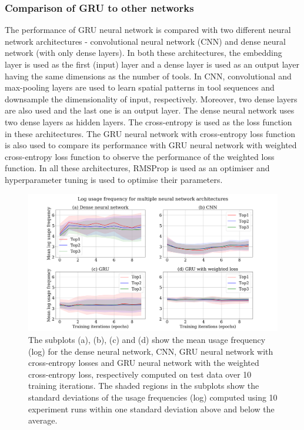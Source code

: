 \documentclass{bioinfo}
\begin{document}
\subsubsection{Comparison of GRU to other networks}
The performance of GRU neural network is compared with two different neural network architectures - convolutional neural network (CNN) and dense neural network (with only dense layers). In both these architectures, the embedding layer is used as the first (input) layer and a dense layer is used as an output layer having the same dimensions as the number of tools. In CNN, convolutional and max-pooling layers are used to learn spatial patterns in tool sequences and downsample the dimensionality of input, respectively. Moreover, two dense layers are also used and the last one is an output layer. The dense neural network uses two dense layers as hidden layers. The cross-entropy is used as the loss function in these architectures. The GRU neural network with cross-entropy loss function is also used to compare its performance with GRU neural network with weighted cross-entropy loss function to observe the performance of the weighted loss function. In all these architectures, RMSProp is used as an optimiser and hyperparameter tuning is used to optimise their parameters.

\begin{figure}
\centerline{\includegraphics[scale=0.19]{bioinformatics_journal/images/usage.png}} \caption{The subplots (a), (b), (c) and (d) show the mean usage frequency (log) for the dense neural network, CNN, GRU neural network with cross-entropy losses and GRU neural network with the weighted cross-entropy loss, respectively computed on test data over 10 training iterations. The shaded regions in the subplots show the standard deviations of the usage frequencies (log) computed using 10 experiment runs within one standard deviation above and below the average.}\label{figure:04}
\end{figure}
\end{document}
